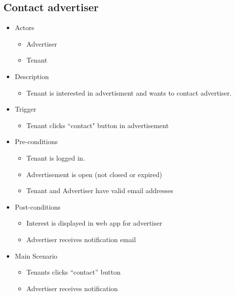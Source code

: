 \documentclass[a4paper,11pt]{article}
\begin{document}
\subsection*{Contact advertiser}
\begin{itemize}
  \item Actors
    \begin{itemize}
      \item Advertiser
      \item Tenant
    \end{itemize}
  \item Description
    \begin{itemize}
      \item Tenant is interested in advertisment and wants to contact advertiser.
    \end{itemize}
 \item Trigger
    \begin{itemize}
      \item Tenant clicks “contact" button in advertisement
    \end{itemize}
  \item Pre-conditions
    \begin{itemize}
    \item Tenant is logged in.
    \item Advertisement is open (not closed or expired)
    \item Tenant and Advertiser have valid email addresses
    \end{itemize}
  \item Post-conditions
    \begin{itemize}
      \item Interest is displayed in web app for advertiser
      \item Advertiser receives notification email
    \end{itemize}
  \item Main Scenario
    \begin{itemize}
      \item Tenants clicks “contact” button
      \item Advertiser receives notification
    \end{itemize}
\end{itemize}
\end{document}

